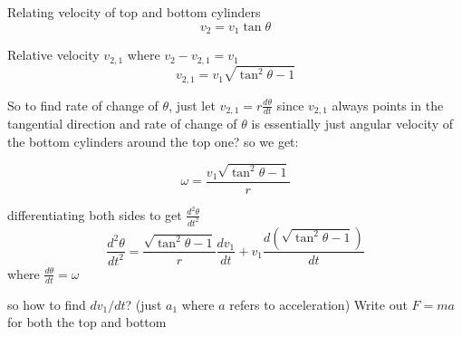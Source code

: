 \documentclass[11pt]{article}
\begin{document}
\begin{enumerate}
\begin{figure}[h]
          \end{figure}

          Relating velocity of top and bottom cylinders
          \begin{equation}
              v_2=v_1 \tan \theta
          \end{equation}

          Relative velocity $v_{2,1}$ where $v_2 -v_{2,1} = v_1$
          \begin{equation}
              v_{2,1}=v_1\sqrt{\tan^2\theta-1}
          \end{equation}

          So to find rate of change of $\theta$, just let $v_{2,1}=r\frac{d\theta}{dt}$ since $v_{2,1}$ always points in the tangential direction and rate of change of $\theta$ is essentially just angular velocity of the bottom cylinders around the top one? so we get:

          \begin{equation}
              \omega=\frac{v_1\sqrt{\tan^2\theta-1}}{r}
          \end{equation}

          differentiating both sides to get $\frac{d^2 \theta}{dt^2}$
          \begin{equation}
              \frac{d^2 \theta}{dt^2}=\frac{\sqrt{\tan^2\theta-1}}{r}\frac{dv_1}{dt}+v_1\frac{d(\sqrt{\tan^2\theta-1})}{dt}
          \end{equation}
          where $\frac{d\theta}{dt}=\omega$

          so how to find $dv_1/dt$? (just $a_1$ where $a$ refers to acceleration)
          Write out $F=ma$ for both the top and bottom


\end{enumerate}
\end{document}
